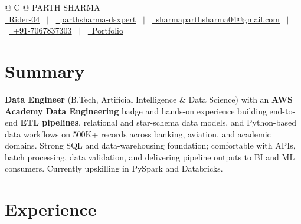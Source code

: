 \documentclass[a4paper,12pt]{article}
\begin{document}
\pagestyle{empty}

\begin{tabularx}{\linewidth}{@{} C @{}}
\Huge{PARTH SHARMA} \\[7.5pt]
\href{https://github.com/Rider-04}{\raisebox{-0.05\height}\faGithub\ Rider-04} \ $|$ \
\href{https://www.linkedin.com/in/parthsharma-dsxpert}{\raisebox{-0.05\height}\faLinkedin\ parthsharma-dsxpert} \ $|$ \
\href{mailto:sharmaparthsharma04@gmail.com}{\raisebox{-0.05\height}\faEnvelope \ sharmaparthsharma04@gmail.com} \ $|$ \
\href{tel:+917067837303}{\raisebox{-0.05\height}\faMobile \ +91-7067837303} \ $|$ \
\href{https://parth-portfolio-virid.vercel.app/}{\raisebox{-0.05\height}\faGlobe \ Portfolio}\end{tabularx}


\section{Summary}
\textbf{Data Engineer} (B.Tech, Artificial Intelligence \& Data Science) with an \textbf{AWS Academy Data Engineering} badge and hands-on experience building end-to-end \textbf{ETL pipelines}, relational and star-schema data models, and Python-based data workflows on 500K+ records across banking, aviation, and academic domains. Strong SQL and data-warehousing foundation; comfortable with APIs, batch processing, data validation, and delivering pipeline outputs to BI and ML consumers. Currently upskilling in PySpark and Databricks.

\section{Experience}
\end{document}
